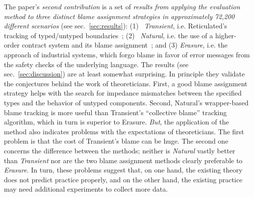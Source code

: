 The paper's {\it second contribution\/} is a set of {\em results from applying
the evaluation method to three distinct blame assignment strategies in
approximately 72,200 different scenarios\/} (see sec.~\ref{sec:results}): (1)~{\it
Transient\/}, i.e. Reticulated's tracking of typed/untyped boundaries~\cite{vss-popl-2017}; (2)~{\it
Natural\/}, i.e. the use of a higher-order contract system and its blame
assignment~\cite{ff-icfp-2002}; and (3) {\it Erasure\/}, i.e. the approach of
industrial systems, which forgo blame in favor of error messages from the safety
checks of the underlying language. The results (see
sec.~\ref{sec:discussion}) are at least somewhat surprising.  In principle
they validate the conjectures behind the work of theoreticians.  First, a good
blame assignment strategy helps with the search for impedance mismatches between
the specified types and the behavior of untyped components.  Second, Natural's
wrapper-based blame tracking is more useful than Transient's ``collective
blame'' tracking algorithm, which in turn is superior to Erasure. {\em But\/},
the application of the method also indicates problems with the expectations of
theoreticians. The first problem is that the cost of Transient's blame can be
huge. The second one concerns the difference between the methods; neither is
{\it Natural\/} vastly better than {\it Transient\/} nor are the two blame
assignment methods clearly preferable to {\it Erasure\/}.  In turn, these
problems suggest that, on one hand, the existing theory does not predict
practice properly, and on the other hand, the existing practice may need
additional experiments to collect more data.
